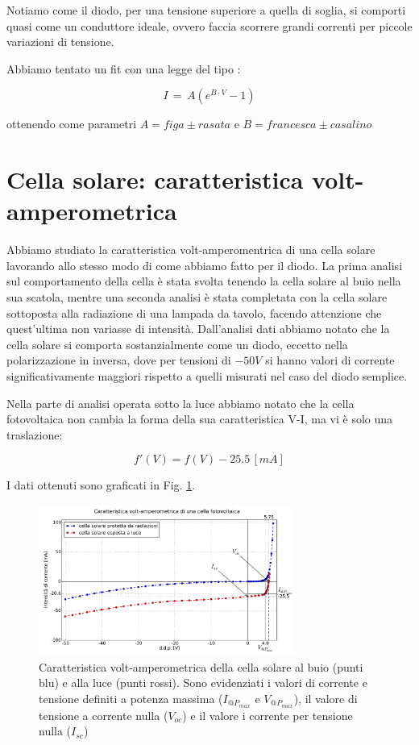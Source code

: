 Notiamo come il diodo, per una tensione superiore a quella di soglia, si comporti quasi come un conduttore ideale, ovvero faccia scorrere grandi correnti per piccole variazioni di tensione. 

Abbiamo tentato un fit con una legge del tipo : 

\begin{equation}
I \, = \, A \left( e^{B \cdot V} -1 \right)
\label{eq:diodefit}
\end{equation}

ottenendo come parametri $A= figa \pm rasata$ e $B= francesca \pm casalino$

\section{Cella solare: caratteristica volt-amperometrica}

Abbiamo studiato la caratteristica volt-amperomentrica di una cella solare lavorando allo stesso modo di come abbiamo fatto per il diodo.
La prima analisi sul comportamento della cella è stata svolta tenendo la cella solare al buio nella sua scatola, mentre una seconda analisi è stata completata con la cella solare sottoposta alla radiazione di una lampada da tavolo, facendo attenzione che quest'ultima non variasse di intensità.
Dall'analisi dati abbiamo notato che la cella solare si comporta sostanzialmente come un diodo, eccetto nella polarizzazione in inversa, dove per tensioni di $-50V$ si hanno valori di corrente significativamente maggiori rispetto a quelli misurati nel caso del diodo semplice. 

Nella parte di analisi operata sotto la luce abbiamo notato che la cella fotovoltaica non cambia la forma della sua caratteristica V-I, ma vi è solo una traslazione: 

$$f'(V)=f(V)-25.5 \, [mA]$$ %
 

I dati ottenuti sono graficati in Fig. \ref{fig:cella}.

\begin{figure}[h]
\center
	\includegraphics[width=0.75\textwidth]{cella.pdf}
	\caption{Caratteristica volt-amperometrica della cella solare al buio (punti blu) e alla luce (punti rossi). Sono evidenziati i valori di corrente e tensione definiti a potenza massima ($I_{@P_{max}}$ e $V_{@P_{max}}$), il valore di tensione a corrente nulla ($V_{oc}$) e il valore i corrente per tensione nulla ($I_{sc}$)}
	\label{fig:cella}
\end{figure}

